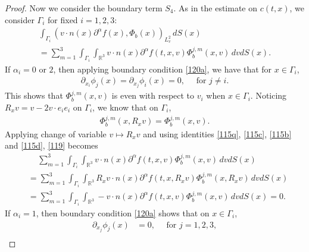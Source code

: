 \documentclass[reqno,a4paper]{amsart}
\numberwithin{equation}{section}
\newcommand{\1}{\mathbf{1}}
\newcommand{\R}{\mathbb{R}}
\renewcommand{\P}{\mathbf{P}}
\newcommand{\<}{\langle}
\renewcommand{\>}{\rangle}
\newcommand{\I}{\mathbf{I}}
\renewcommand{\P}{\mathbf{P}}
\begin{document}
\begin{proof}
%		
		Now we consider the boundary term $S_4$. As in the estimate on $c(t,x)$, we consider $\Gamma_i$ for fixed $i=1,2,3$: 
		\begin{multline}\label{119}
			\int_{\Gamma_i}(v\cdot n(x){\partial^\alpha f}(x),{\Phi_b}(x))_{L^2_v}\,dS(x)\\
			= \sum_{m=1}^3\int_{\Gamma_i}\int_{\R^3}v\cdot n(x){\partial^\alpha f}(t,x,v){\Phi^{j,m}_b}(x,v)\,dvdS(x).
		\end{multline}
		If $\alpha_i=0$ or $2$, then applying boundary condition \eqref{120a}, we have that for $x\in\Gamma_i$, 
		\begin{align*}
			\partial_{x_i}\phi_j(x) = \partial_{x_j}\phi_i(x) = 0,\quad\text{ for }j\neq i. 
		\end{align*}
	This shows that $\Phi^{j,m}_b(x,v)$ is even with respect to $v_i$ when $x\in\Gamma_i$. 
	Noticing $R_xv = v-2v\cdot e_ie_i$ on $\Gamma_i$, we know that on $\Gamma_i$, 
	\begin{align*}
		{\Phi^{j,m}_b}(x,R_xv) = {\Phi^{j,m}_b}(x,v).
	\end{align*} 		
	Applying change of variable $v\mapsto R_xv$ and using identities \eqref{115q}, \eqref{115c}, \eqref{115b} and \eqref{115d}, \eqref{119} becomes 
		\begin{align*}
			&\quad\, \sum_{m=1}^3\int_{\Gamma_i}\int_{\R^3}v\cdot n(x){\partial^\alpha f}(t,x,v){\Phi^{j,m}_b}(x,v)\,dvdS(x)\\
			&=\sum_{m=1}^3\int_{\Gamma_i}\int_{\R^3}R_xv\cdot n(x){\partial^\alpha f}(t,x,R_xv){\Phi^{j,m}_b}(x,R_xv)\,dvdS(x)\\
			&=\sum_{m=1}^3\int_{\Gamma_i}\int_{\R^3}-v\cdot n(x){\partial^\alpha f}(t,x,v){\Phi^{j,m}_b}(x,v)\,dvdS(x)=0.
		\end{align*}
	If $\alpha_i=1$, then boundary condition \eqref{120a} shows that on $x\in\Gamma_i$, 
	\begin{align*}
		\partial_{x_j}\phi_j(x) &= 0, \quad \text{ for }j=1,2,3,\\

\end{align*}
\end{proof}
\end{document}
